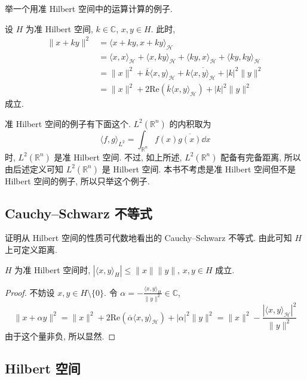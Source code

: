 举一个用准 Hilbert 空间中的运算计算的例子.

\begin{example}\label{exa:2.5}
设 $H$ 为准 Hilbert 空间, $k \in \mathbb{C}$, $x, y \in H$. 此时,
\begin{align*}
\|x + ky\|^{2} &= \langle x + ky, x + ky \rangle_{\mathcal{H}} \\
&= \langle x, x \rangle_{\mathcal{H}} + \langle x, ky \rangle_{\mathcal{H}} + \langle ky, x \rangle_{\mathcal{H}} + \langle ky, ky \rangle_{\mathcal{H}} \\
&= \|x\|^{2} + \overline{k}\langle x, y \rangle_{\mathcal{H}} + k\overline{\langle x, y \rangle_{\mathcal{H}}} + |k|^{2}\|y\|^{2} \\
&= \|x\|^{2} + 2\mathrm{Re}(\overline{k}\langle x, y \rangle_{\mathcal{H}}) + |k|^{2}\|y\|^{2}
\end{align*}
成立.
\end{example}

准 Hilbert 空间的例子有下面这个. $L^{2}(\mathbb{R}^{n})$ 的内积取为
\[
\langle f, g \rangle_{L^{2}} = \int_{\mathbb{R}^{n}}f(x)\overline{g(x)}\dd x
\]
时, $L^{2}(\mathbb{R}^{n})$ 是准 Hilbert 空间. 不过, 如上所述, $L^{2}(\mathbb{R}^{n})$ 配备有完备距离, 所以由后述定义可知 $L^{2}(\mathbb{R}^{n})$ 是 Hilbert 空间. 本书不考虑是准 Hilbert 空间但不是 Hilbert 空间的例子, 所以只举这个例子.

\subsection*{Cauchy--Schwarz 不等式}

证明从 Hilbert 空间的性质可代数地看出的 Cauchy--Schwarz 不等式. 由此可知 $H$ 上可定义距离.

\begin{theorem}\label{thm:2.25}
$H$ 为准 Hilbert 空间时, $|\langle x, y \rangle_{H}| \leq \|x\|\|y\|$, $x, y \in H$ 成立.
\end{theorem}

\begin{proof}
不妨设 $x, y \in H \setminus \{0\}$. 令 $\alpha = -\frac{\langle x, y \rangle_{H}}{\|y\|^{2}} \in \mathbb{C}$,
\[
\|x + \alpha y\|^{2} = \|x\|^{2} + 2\mathrm{Re}(\overline{\alpha}\langle x, y \rangle_{\mathcal{H}}) + |\alpha|^{2}\|y\|^{2} = \|x\|^{2} - \frac{|\langle x, y \rangle_{\mathcal{H}}|^{2}}{\|y\|^{2}}
\]
由于这个量非负, 所以显然.
\end{proof}

\subsection*{Hilbert 空间}

